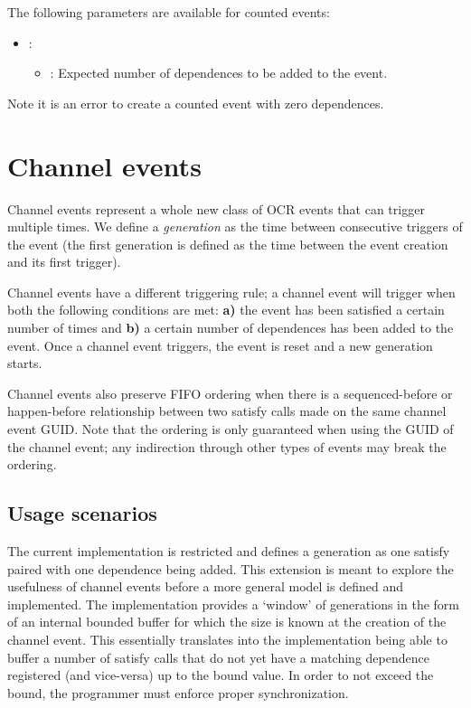The following parameters are available for counted events:
\begin{itemize}
\item {}:
\begin{itemize}
\item {}: Expected number of dependences to be added to the event.
\end{itemize}
\end{itemize}

Note it is an error to create a counted event with zero dependences.

\section{Channel events}
Channel events represent a whole new class of OCR events that can
trigger multiple times. We define a \emph{generation} as the time
between consecutive triggers of the event (the first generation is
defined as the time between the event creation and its first trigger).

Channel events have a different triggering rule; a channel event will
trigger when both the following conditions are met: {\bf a)} the event
has been satisfied a certain number of times and {\bf b)} a certain
number of dependences has been added to the event. Once a channel
event triggers, the event is reset and a new generation starts.

Channel events also preserve FIFO ordering when
there is a sequenced-before or happen-before relationship between two
satisfy calls made on the same channel event GUID. Note that the ordering
is only guaranteed when using the GUID of the channel event; any
indirection through other types of events may break the ordering.

\subsection{Usage scenarios}
The current implementation is restricted and defines a generation as
one satisfy paired with one dependence being added. This extension
is meant to explore the usefulness of channel events before a more
general model is defined and implemented. The
implementation provides a `window' of generations in the form of an
internal bounded buffer for which the size is known at the creation of
the channel event. This essentially translates into the implementation
being able to buffer a number of satisfy calls that do not yet have a
matching dependence registered (and vice-versa) up to the bound
value. In order to not exceed the bound, the programmer must enforce
proper synchronization.

